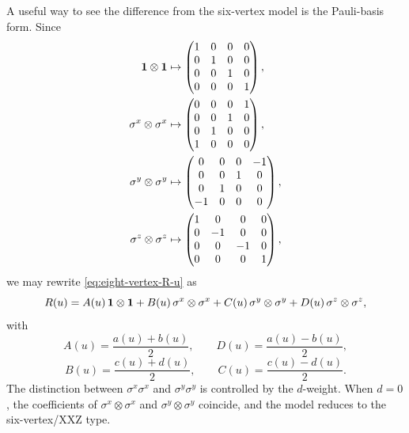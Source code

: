 A useful way to see the difference from the six-vertex model is the Pauli-basis
form.  Since
\begin{align}
    \mathbf{1}\otimes\mathbf{1}
    &\mapsto
    \begin{pmatrix}
        1&0&0&0\\0&1&0&0\\0&0&1&0\\0&0&0&1
    \end{pmatrix},\\
    \sigma^x\otimes\sigma^x
    &\mapsto
    \begin{pmatrix}
        0&0&0&1\\0&0&1&0\\0&1&0&0\\1&0&0&0
    \end{pmatrix},\\
    \sigma^y\otimes\sigma^y
    &\mapsto
    \begin{pmatrix}
        0&0&0&-1\\0&0&1&0\\0&1&0&0\\-1&0&0&0
    \end{pmatrix},\\
    \sigma^z\otimes\sigma^z
    &\mapsto
    \begin{pmatrix}
        1&0&0&0\\0&-1&0&0\\0&0&-1&0\\0&0&0&1
    \end{pmatrix},
\end{align}
we may rewrite \cref{eq:eight-vertex-R-u} as
\begin{equation}
\label{eq:eight-vertex-R-Pauli-basis}
    R(u)=
    A(u)\,\mathbf{1}\otimes\mathbf{1}
    +B(u)\,\sigma^x\otimes\sigma^x
    +C(u)\,\sigma^y\otimes\sigma^y
    +D(u)\,\sigma^z\otimes\sigma^z,
\end{equation}
with
\begin{equation}
\label{eq:eight-vertex-ABCD}
    A(u)=\frac{a(u)+b(u)}{2},
    \qquad
    D(u)=\frac{a(u)-b(u)}{2},
\end{equation}
\begin{equation}
\label{eq:eight-vertex-BCD}
    B(u)=\frac{c(u)+d(u)}{2},
    \qquad
    C(u)=\frac{c(u)-d(u)}{2}.
\end{equation}
The distinction between $\sigma^x\sigma^x$ and $\sigma^y\sigma^y$ is controlled
by the $d$-weight.  When $d=0$, the coefficients of
$\sigma^x\otimes\sigma^x$ and $\sigma^y\otimes\sigma^y$ coincide, and the model
reduces to the six-vertex/XXZ type.

